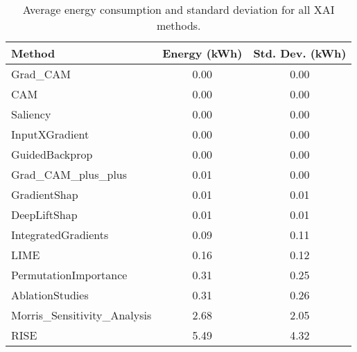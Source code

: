 \begin{table}[ht]
\centering
\begin{tabular}{lcc}
\hline
Method & Energy (kWh) & Std. Dev. (kWh) \\
\hline
Grad_CAM & 0.00 & 0.00 \\
CAM & 0.00 & 0.00 \\
Saliency & 0.00 & 0.00 \\
InputXGradient & 0.00 & 0.00 \\
GuidedBackprop & 0.00 & 0.00 \\
Grad_CAM_plus_plus & 0.01 & 0.00 \\
GradientShap & 0.01 & 0.01 \\
DeepLiftShap & 0.01 & 0.01 \\
IntegratedGradients & 0.09 & 0.11 \\
LIME & 0.16 & 0.12 \\
PermutationImportance & 0.31 & 0.25 \\
AblationStudies & 0.31 & 0.26 \\
Morris_Sensitivity_Analysis & 2.68 & 2.05 \\
RISE & 5.49 & 4.32 \\
\hline
\end{tabular}
\caption{Average energy consumption and standard deviation for all XAI methods.}
\label{tab:energy_all}
\end{table}
